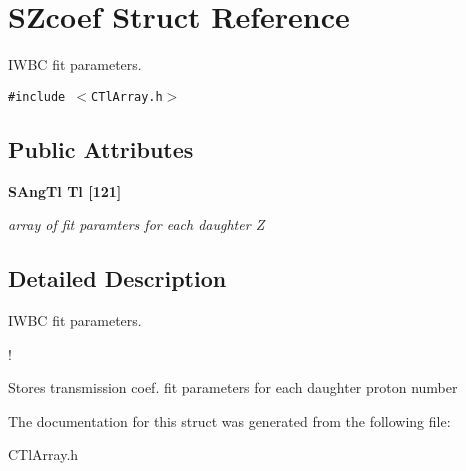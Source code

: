 \section{SZcoef Struct Reference}
\label{structSZcoef}
IWBC fit parameters.  


{\tt \#include $<$CTl\-Array.h$>$}

\subsection*{Public Attributes}
\begin{CompactItemize}
\item 
\bf{SAng\-Tl} \bf{Tl} [121]\label{structSZcoef_10fce725eb0bb6417e034df3d3c7d46e}

\begin{CompactList}\small\item\em array of fit paramters for each daughter Z \item\end{CompactList}\end{CompactItemize}


\subsection{Detailed Description}
IWBC fit parameters. 

!

Stores transmission coef. fit parameters for each daughter proton number 



The documentation for this struct was generated from the following file:\begin{CompactItemize}
\item 
CTl\-Array.h\end{CompactItemize}

